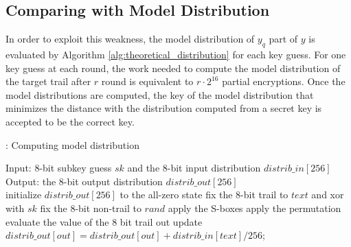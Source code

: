 \subsection{Comparing with Model Distribution} In order to exploit this weakness, the model distribution of $y_q$ part of $y$ is evaluated by Algorithm \ref{alg:theoretical_distribution} for each key guess. For one key guess at each round, the work needed to compute the model distribution of the target trail after $r$ round is equivalent to $r \cdot 2^{16}$ partial encryptions. Once the model distributions are computed, the key of the model distribution that minimizes the distance with the distribution computed from a secret key is accepted to be the correct key. 
\begin{algorithm}
\caption{: Computing model distribution}
\label{alg:theoretical_distribution}
\begin{algorithmic}[1]
\State Input: $8$-bit subkey guess $sk$ and the $8$-bit input distribution $distrib\_in[256]$
\State Output: the $8$-bit output distribution $distrib\_out[256]$\\
\State initialize $distrib\_out[256]$ to the all-zero state
		\State fix the $8$-bit trail to $text$ and xor with $sk$
		\State fix the $8$-bit non-trail to $rand$
		\State apply the S-boxes
		\State apply the permutation
		\State evaluate the value of the $8$ bit trail out
		\State update $distrib\_out[out]= distrib\_out[out] + distrib\_in[text]/256$;
	\EndFor
\EndFor
\end{algorithmic}
\end{algorithm}
